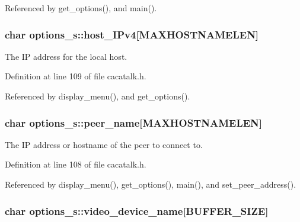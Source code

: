 \-Referenced by get\-\_\-options(), and main().

\hypertarget{structoptions__s_a6eae09fe8cfc8e82b1f9b683f4f3e982}{
\subsubsection[{host\-\_\-\-I\-Pv4}]{\setlength{\rightskip}{0pt plus 5cm}char {\bf options\-\_\-s\-::host\-\_\-\-I\-Pv4}\mbox{[}\-M\-A\-X\-H\-O\-S\-T\-N\-A\-M\-E\-L\-E\-N\mbox{]}}}\label{structoptions__s_a6eae09fe8cfc8e82b1f9b683f4f3e982}


\-The \-I\-P address for the local host. 



\-Definition at line 109 of file cacatalk.\-h.



\-Referenced by display\-\_\-menu(), and get\-\_\-options().

\hypertarget{structoptions__s_a3bc5783f374ad410635b68a77c26e76d}{
\subsubsection[{peer\-\_\-name}]{\setlength{\rightskip}{0pt plus 5cm}char {\bf options\-\_\-s\-::peer\-\_\-name}\mbox{[}\-M\-A\-X\-H\-O\-S\-T\-N\-A\-M\-E\-L\-E\-N\mbox{]}}}\label{structoptions__s_a3bc5783f374ad410635b68a77c26e76d}


\-The \-I\-P address or hostname of the peer to connect to. 



\-Definition at line 108 of file cacatalk.\-h.



\-Referenced by display\-\_\-menu(), get\-\_\-options(), main(), and set\-\_\-peer\-\_\-address().

\hypertarget{structoptions__s_a361e705ec36167283f446c42276b0daf}{
\subsubsection[{video\-\_\-device\-\_\-name}]{\setlength{\rightskip}{0pt plus 5cm}char {\bf options\-\_\-s\-::video\-\_\-device\-\_\-name}\mbox{[}{\bf \-B\-U\-F\-F\-E\-R\-\_\-\-S\-I\-Z\-E}\mbox{]}}}\label{structoptions__s_a361e705ec36167283f446c42276b0daf}


